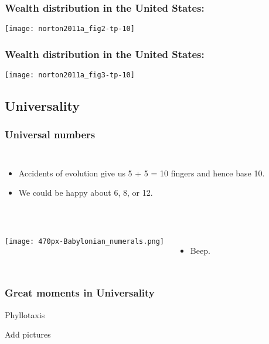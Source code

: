 \begin{frame}

  \frametitle{Wealth distribution in the United States:}

  \texttt{[image: norton2011a\_fig2-tp-10]}
  
\end{frame}

\begin{frame}

  \frametitle{Wealth distribution in the United States:}

  \texttt{[image: norton2011a\_fig3-tp-10]}
  
\end{frame}

\subsection{Universality}

\begin{frame}
  \frametitle{Universal numbers}

  \begin{columns}
    \begin{itemize}
    \item<1-> 
      Accidents of evolution give us 5 + 5 = 10 fingers
      and hence base 10.
    \item<2->
      We could be happy about 6, 8, or 12.
    \end{itemize}
  \end{columns}
  

\end{frame}

\begin{frame}
  \frametitle{}


  \begin{columns}
    \texttt{[image: 470px-Babylonian\_numerals.png]}
    \begin{itemize}
    \item<1->
      Beep.
    \end{itemize}
  \end{columns}
\end{frame}

\begin{frame}
  \frametitle{Great moments in Universality}

  Phyllotaxis

  Add pictures
\end{frame}


